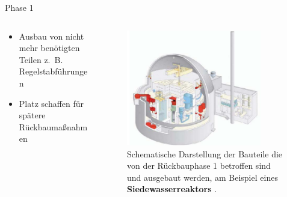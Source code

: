 \begin{frame}{Phase 1}
  \begin{columns}

    \begin{column}{0.48\textwidth}
      \begin{itemize}
        \setlength\itemsep{1.2em}
        \item{ Ausbau von nicht mehr benötigten Teilen z.\, B. Regelstabführungen }
        \item{ Platz schaffen für spätere Rückbaumaßnahmen}
      \end{itemize}
    \end{column}

    \begin{column}{0.48\textwidth}
      \begin{figure}
         \centering
         \includegraphics[width=0.85\textwidth]{./bilder/abbau_schritt_1.PNG}
         \caption{Schematische Darstellung der Bauteile die von der Rückbauphase 1 betroffen sind und ausgebaut werden, am Beispiel eines \textbf{Siedewasserreaktors} \cite{stilllegung_grs}. }
         \label{ fig: phase_1 }
       \end{figure}
    \end{column}

  \end{columns}
\end{frame}



